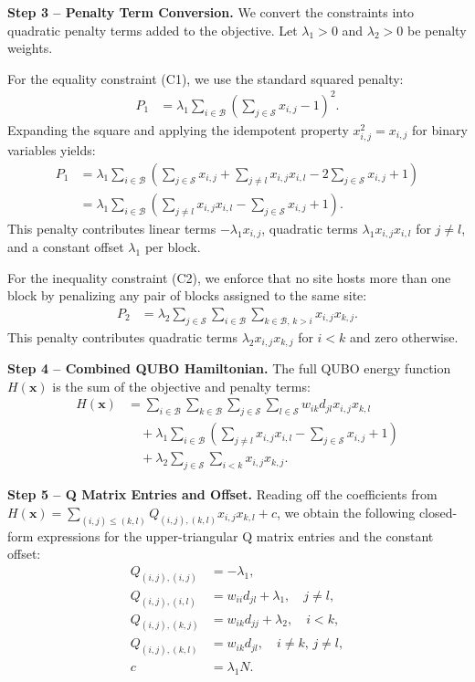 \documentclass[12pt]{article}
\begin{document}
\textbf{Step 3 -- Penalty Term Conversion.} We convert the constraints into quadratic penalty terms added to the objective. Let $\lambda_1 > 0$ and $\lambda_2 > 0$ be penalty weights.

For the equality constraint (C1), we use the standard squared penalty:
\begin{align}
    P_1 &= \lambda_1 \sum_{i \in \mathcal{B}} \left( \sum_{j \in \mathcal{S}} x_{i,j} - 1 \right)^2.
\end{align}
Expanding the square and applying the idempotent property $x_{i,j}^2 = x_{i,j}$ for binary variables yields:
\begin{align}
    P_1 &= \lambda_1 \sum_{i \in \mathcal{B}} \left( \sum_{j \in \mathcal{S}} x_{i,j} + \sum_{j \neq l} x_{i,j} x_{i,l} - 2 \sum_{j \in \mathcal{S}} x_{i,j} + 1 \right) \\
    &= \lambda_1 \sum_{i \in \mathcal{B}} \left( \sum_{j \neq l} x_{i,j} x_{i,l} - \sum_{j \in \mathcal{S}} x_{i,j} + 1 \right).
\end{align}
This penalty contributes linear terms $-\lambda_1 x_{i,j}$, quadratic terms $\lambda_1 x_{i,j} x_{i,l}$ for $j \neq l$, and a constant offset $\lambda_1$ per block.

For the inequality constraint (C2), we enforce that no site hosts more than one block by penalizing any pair of blocks assigned to the same site:
\begin{align}
    P_2 &= \lambda_2 \sum_{j \in \mathcal{S}} \sum_{i \in \mathcal{B}} \sum_{k \in \mathcal{B}, \, k > i} x_{i,j} x_{k,j}.
\end{align}
This penalty contributes quadratic terms $\lambda_2 x_{i,j} x_{k,j}$ for $i < k$ and zero otherwise.

\textbf{Step 4 -- Combined QUBO Hamiltonian.} The full QUBO energy function $H(\mathbf{x})$ is the sum of the objective and penalty terms:
\begin{align}
    H(\mathbf{x}) &= \sum_{i \in \mathcal{B}} \sum_{k \in \mathcal{B}} \sum_{j \in \mathcal{S}} \sum_{l \in \mathcal{S}} w_{ik} d_{jl} x_{i,j} x_{k,l} \nonumber \\
    &\quad + \lambda_1 \sum_{i \in \mathcal{B}} \left( \sum_{j \neq l} x_{i,j} x_{i,l} - \sum_{j \in \mathcal{S}} x_{i,j} + 1 \right) \nonumber \\
    &\quad + \lambda_2 \sum_{j \in \mathcal{S}} \sum_{i < k} x_{i,j} x_{k,j}.
\end{align}

\textbf{Step 5 -- Q Matrix Entries and Offset.} Reading off the coefficients from $H(\mathbf{x}) = \sum_{(i,j) \le (k,l)} Q_{(i,j),(k,l)} x_{i,j} x_{k,l} + c$, we obtain the following closed-form expressions for the upper-triangular Q matrix entries and the constant offset:
\begin{align}
    Q_{(i,j),(i,j)} &= -\lambda_1, \\
    Q_{(i,j),(i,l)} &= w_{ii} d_{jl} + \lambda_1, \quad j \neq l, \\
    Q_{(i,j),(k,j)} &= w_{ik} d_{jj} + \lambda_2, \quad i < k, \\
    Q_{(i,j),(k,l)} &= w_{ik} d_{jl}, \quad i \neq k, \, j \neq l, \\
    c &= \lambda_1 N.
\end{align}
\end{document}
